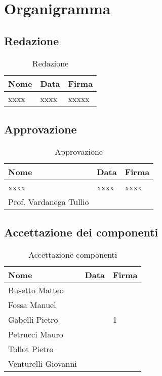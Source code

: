 \section{Organigramma}


\subsection{Redazione}
	\begin{table}[H]
		\centering
	  \begin{tabular}{p{}p{}
		    							p{}}
		   \toprule Nome & Data & Firma \\
		   \midrule
		   xxxx & xxxx & xxxxx \\
		   \bottomrule
	 \end{tabular}
	 	\label{tab:Redazione}
	 	\caption{Redazione}
	\end{table}

\subsection{Approvazione}
	\begin{table}[H]
		\centering
	  \begin{tabular}{p{}p{}
		    							p{}}
		   \toprule Nome & Data & Firma \\
		   \midrule
		   xxxx & xxxx & xxxx \\
		   Prof. Vardanega Tullio &  &  \\
		   \bottomrule
	 \end{tabular}
	 	\label{tab:Approvazione}
	 	\caption{Approvazione}
	\end{table}

\subsection{Accettazione dei componenti}
	\begin{table}[H]
		\centering
	  \begin{tabular}{p{}p{}
		    							p{}}
		   \toprule Nome & Data & Firma \\
		   \midrule
		   Busetto Matteo & &  \\
		   Fossa Manuel &  &  \\
		   Gabelli Pietro &  & 1 \\
		   Petrucci Mauro &  &  \\
		   Tollot Pietro &  &  \\
		   Venturelli Giovanni &  &  \\

		   \bottomrule
	 \end{tabular}
	 	\label{tab:AccettazioneComponenti}
	 	\caption{Accettazione componenti}
	\end{table}
